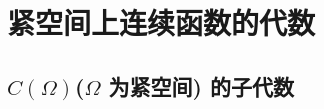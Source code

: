 \chapter{紧空间上连续函数的代数}
\section{\texorpdfstring{$C(\Omega)$}{C(Omega)}(\texorpdfstring{$\Omega$}{Omega} 为紧空间) 的子代数}
